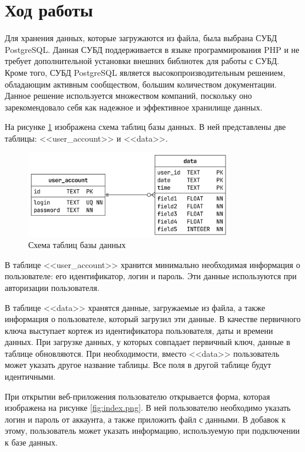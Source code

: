 \documentclass[a4paper, 14pt]{extarticle}
\begin{document}
\newpage

\section{Ход работы}

Для хранения данных, которые загружаются из файла, была выбрана СУБД PostgreSQL.
Данная СУБД поддерживается в языке программирования PHP и не требует
дополнительной установки внешних библиотек для работы с СУБД. Кроме того, СУБД
PostgreSQL является высокопроизводительным решением, обладающим активным
сообществом, большим количеством документации. Данное решение используется
множеством компаний, поскольку оно зарекомендовало себя как надежное и
эффективное хранилище данных.

На рисунке \ref{fig:puml/database.png} изображена схема таблиц базы данных. В
ней представлены две таблицы: <<user\_account>> и <<data>>.

\begin{figure}[H]
  \centering
  \includegraphics[width=0.8\textwidth]{images/puml/database.png}
  \caption{Схема таблиц базы данных}
  \label{fig:puml/database.png}
\end{figure}

В таблице <<user\_account>> хранится минимально необходимая информация о
пользователе: его идентификатор, логин и пароль. Эти данные используются при
авторизации пользователя.

В таблице <<data>> хранятся данные, загружаемые из файла, а также информация о
пользователе, который загрузил эти данные. В качестве первичного ключа выступает
кортеж из идентификатора пользователя, даты и времени данных. При загрузке
данных, у которых совпадает первичный ключ, данные в таблице обновляются. При
необходимости, вместо <<data>> пользователь может указать другое название
таблицы. Все поля в другой таблице будут идентичными.

При открытии веб-приложения пользователю открывается форма, которая изображена
на рисунке \ref{fig:index.png}. В ней пользователю необходимо указать логин и
пароль от аккаунта, а также приложить файл с данными. В добавок к этому,
пользователь может указать информацию, используемую при подключении к базе
данных.
\end{document}

